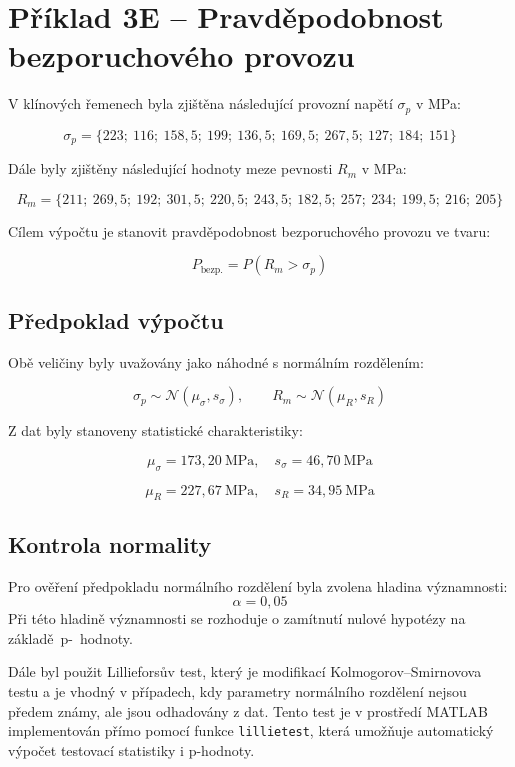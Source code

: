 \section{Příklad 3E -- Pravděpodobnost bezporuchového provozu}



V klínových řemenech byla zjištěna následující provozní napětí $\sigma_p$ v MPa:

\[
\sigma_p =
\{223;\ 116;\ 158{,}5;\ 199;\ 136{,}5;\ 169{,}5;\ 267{,}5;\ 127;\ 184;\ 151\}
\]


\noindent
Dále byly zjištěny následující hodnoty meze pevnosti $R_m$ v MPa:

\[
R_m =
\{211;\ 269{,}5;\ 192;\ 301{,}5;\ 220{,}5;\ 243{,}5;\ 182{,}5;\ 257;\ 234;\ 199{,}5;\ 216;\ 205\}
\]

Cílem výpočtu je stanovit pravděpodobnost bezporuchového provozu ve tvaru:

\begin{equation}
P_{\text{bezp.}} = P(R_m > \sigma_p)
\label{eq:pravd}
\end{equation}

\subsection*{Předpoklad výpočtu}

Obě veličiny byly uvažovány jako náhodné s normálním rozdělením:

\begin{equation}
\sigma_p \sim \mathcal{N}(\mu_{\sigma}, s_{\sigma}), \qquad
R_m \sim \mathcal{N}(\mu_R, s_R)
\label{eq:normalita}
\end{equation}


\noindent
Z dat byly stanoveny statistické charakteristiky:

\[
\mu_{\sigma} = 173{,}20\ \text{MPa}, \quad
s_{\sigma} = 46{,}70\ \text{MPa}
\]

\[
\mu_R = 227{,}67\ \text{MPa}, \quad
s_R = 34{,}95\ \text{MPa}
\]

\subsection*{Kontrola normality}

Pro ověření předpokladu normálního rozdělení byla zvolena hladina významnosti:
\[
\alpha = 0{,}05
\]
Při této hladině významnosti se rozhoduje o zamítnutí nulové hypotézy na základě~p-~hodnoty.

Dále byl použit Lillieforsův test, který je modifikací Kolmogorov--Smirnovova testu a je vhodný v případech, kdy parametry normálního rozdělení nejsou předem známy, ale jsou odhadovány z dat. Tento test je v prostředí MATLAB implementován přímo pomocí funkce \texttt{lillietest}, která umožňuje automatický výpočet testovací statistiky i p-hodnoty.

